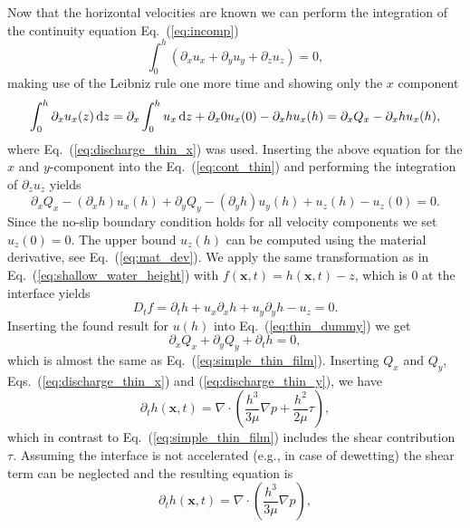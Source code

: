 Now that the horizontal velocities are known we can perform the integration of the continuity equation Eq.~(\ref{eq:incomp})
\begin{equation}\label{eq:cont_thin}
    \int_0^h(\partial_x u_x + \partial_y u_y + \partial_z u_z) = 0,
\end{equation}
making use of the Leibniz rule one more time and showing only the $x$ component
\begin{equation}
    \int_0^h \partial_x u_x(z) \mathop{}\!\mathrm{d} z = \partial_x\int_0^h u_x\mathop{}\!\mathrm{d} z + \partial_x 0 u_x(0) - \partial_x h u_x(h) = \partial_x Q_x - \partial_x h u_x(h),  
\end{equation}
where Eq.~(\ref{eq:discharge_thin_x}) was used.
Inserting the above equation for the $x$ and $y$-component into the Eq.~(\ref{eq:cont_thin}) and performing the integration of $\partial_z u_z$ yields
\begin{equation}\label{eq:thin_dummy}
    \partial_x Q_x - (\partial_x h) u_x(h) + \partial_y Q_y - (\partial_y h) u_y(h) + u_z(h) - u_z(0) = 0.
\end{equation}
Since the no-slip boundary condition holds for all velocity components we set $u_z(0) = 0$.
The upper bound $u_z(h)$ can be computed using the material derivative, see Eq.~(\ref{eq:mat_dev}). 
We apply the same transformation as in Eq.~(\ref{eq:shallow_water_height}) with $f(\mathbf{x},t) = h(\mathbf{x},t) - z$, which is $0$ at the interface yields
\begin{equation}\label{eq:mat_uz_h}
    D_t f = \partial_t h + u_x\partial_x h + u_y\partial_y h - u_z = 0.
\end{equation}
Inserting the found result for $u(h)$ into Eq.~(\ref{eq:thin_dummy}) we get
\begin{equation}\label{eq:thin_obsc}
    \partial_x Q_x + \partial_y Q_y + \partial_t h = 0,
\end{equation}
which is almost the same as Eq.~(\ref{eq:simple_thin_film}).
Inserting $Q_x$ and $Q_y$, Eqs.~(\ref{eq:discharge_thin_x}) and (\ref{eq:discharge_thin_y}), we have
\begin{equation}
    \partial_t h(\mathbf{x},t) = \nabla\cdot\left(\frac{h^3}{3\mu}\nabla p + \frac{h^2}{2\mu}\tau\right),
\end{equation}
which in contrast to Eq.~(\ref{eq:simple_thin_film}) includes the shear contribution $\tau$.
Assuming the interface is not accelerated (e.g., in case of dewetting) the shear term can be neglected and the resulting equation is 
\begin{equation}\label{eq:thin_final}
    \partial_t h(\mathbf{x},t) = \nabla\cdot\left(\frac{h^3}{3\mu}\nabla p\right),
\end{equation}
